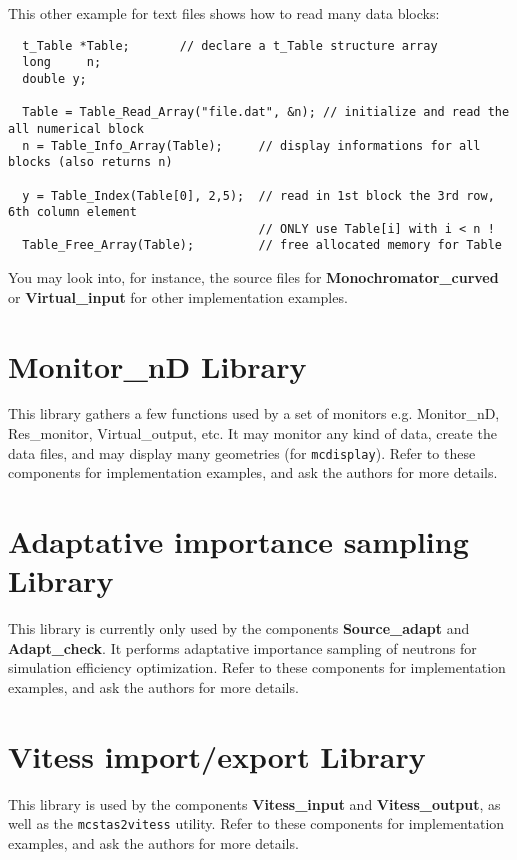 This other example for text files shows how to read many data blocks:
\begin{verbatim}
  t_Table *Table;       // declare a t_Table structure array
  long     n;
  double y;

  Table = Table_Read_Array("file.dat", &n); // initialize and read the all numerical block
  n = Table_Info_Array(Table);     // display informations for all blocks (also returns n)

  y = Table_Index(Table[0], 2,5);  // read in 1st block the 3rd row, 6th column element
                                   // ONLY use Table[i] with i < n !
  Table_Free_Array(Table);         // free allocated memory for Table
\end{verbatim}

You may look into, for instance, the source files for
{\bf Monochromator\_curved} or {\bf Virtual\_input}
for other implementation examples.

\section{Monitor\_nD Library}

This library gathers a few functions used by a set of monitors e.g. Monitor\_nD, Res\_monitor, Virtual\_output, etc.
It may monitor any kind of data, create the data files, and may display many geometries (for \verb+mcdisplay+).
Refer to these components for implementation examples, and ask the authors for more details.

\section{Adaptative importance sampling Library}

This library is currently only used by the components {\bf Source\_adapt}
and {\bf Adapt\_check}. It performs adaptative importance sampling of neutrons for simulation efficiency optimization.
Refer to these components for implementation examples, and ask the authors for more details.

\section{Vitess import/export Library}

This library is used by the components
{\bf Vitess\_input} and {\bf Vitess\_output},
as well as the \verb+mcstas2vitess+ utility.
Refer to these components for implementation examples, and ask the authors for more details.

